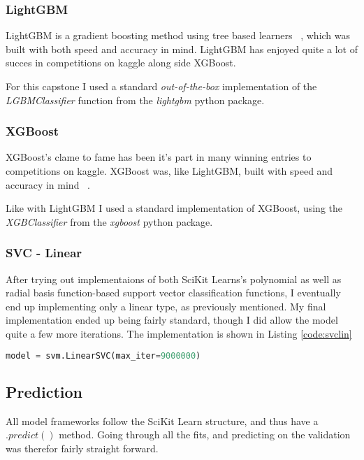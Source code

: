 \documentclass[12pt]{article}
\begin{document}
\subsubsection{LightGBM}

LightGBM is a gradient boosting method using tree based learners ~\cite{NIPS2017_6907}, which was built with both speed and accuracy in mind. LightGBM has enjoyed quite a lot of succes in competitions on kaggle along side XGBoost.

For this capstone I used a standard \emph{out-of-the-box} implementation of the \emph{LGBMClassifier} function from the \emph{lightgbm} python package.

\subsubsection{XGBoost}

XGBoost's clame to fame has been it's part in many winning entries to competitions on kaggle. XGBoost was, like LightGBM, built with speed and accuracy in mind ~\cite{xgboostcite}.

Like with LightGBM I used a standard implementation of XGBoost, using the \emph{XGBClassifier} from the \emph{xgboost} python package.

\subsubsection{SVC - Linear}

After trying out implementaions of both SciKit Learns's polynomial as well as radial basis function-based support vector classification functions, I eventually end up implementing only a linear type, as previously mentioned. My final implementation ended up being fairly standard, though I did allow the model quite a few more iterations. The implementation is shown in Listing \ref{code:svclin}

\begin{lstlisting}[language=python,frame=single,caption=SVC Linear Implementation, label=code:svclin]
model = svm.LinearSVC(max_iter=9000000)
\end{lstlisting}


\subsection{Prediction}\label{impl:modpred}

All model frameworks follow the SciKit Learn structure, and thus have a $.predict()$ method. Going through all the fits, and predicting on the validation was therefor fairly straight forward. 
\end{document}
